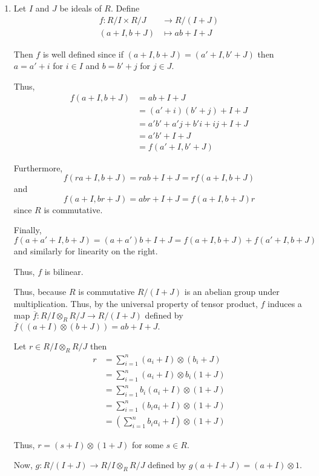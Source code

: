 \documentclass[12pt]{Qual}
\begin{document}
\begin{solution}$\,$
\begin{enumerate}[label=(\alph*)]
    \item Let $I$ and $J$ be ideals of $R$. Define \begin{align*}
        f:R/I\times R/J&\to R/(I+J)\\
        (a+I,b+J)&\mapsto ab+I+J
    \end{align*}

    Then $f$ is well defined since if $(a+I,b+J)=(a'+I,b'+J)$ then $a=a'+i$ for $i\in I$ and $b=b'+j$ for $j\in J.$

    Thus, \begin{align*}
        f(a+I,b+J)&=ab+I+J\\
        &=(a'+i)(b'+j)+I+J\\
        &=a'b'+a'j+b'i+ij+I+J\\
        &=a'b'+I+J\\
        &=f(a'+I,b'+J)
    \end{align*}

    Furthermore, $$f(ra+I,b+J)=rab+I+J=rf(a+I,b+J)$$ and $$f(a+I,br+J)=abr+I+J=f(a+I,b+J)r$$ since $R$ is commutative.

    Finally, $$f(a+a'+I,b+J)=(a+a')b+I+J=f(a+I,b+J)+f(a'+I,b+J)$$ and similarly for linearity on the right.

    Thus, $f$ is bilinear.

    Thus, because $R$ is commutative $R/(I+J)$ is an abelian group under multiplication. Thus, by the universal property of tensor product, $f$ induces a map $\overline{f}:R/I\otimes_R R/J\to R/(I+J)$ defined by $\overline{f}((a+I)\otimes(b+J))=ab+I+J.$

    Let $r\in R/I\otimes_R R/J$ then \begin{align*}
        r&=\sum_{i=1}^n(a_i+I)\otimes(b_i+J)\\
        &=\sum_{i=1}^n(a_i+I)\otimes b_i(1+J)\\
        &=\sum_{i=1}^nb_i(a_i+I)\otimes (1+J)\\
        &=\sum_{i=1}^n(b_ia_i+I)\otimes (1+J)\\
        &=\left(\sum_{i=1}^nb_ia_i+I\right)\otimes (1+J)
    \end{align*}

    Thus, $r=(s+I)\otimes(1+J)$ for some $s\in R$.

    Now, $g:R/(I+J)\to R/I\otimes_R R/J$ defined by $g(a+I+J)=(a+I)\otimes 1.$


\end{enumerate}
\end{solution}
\end{document}
